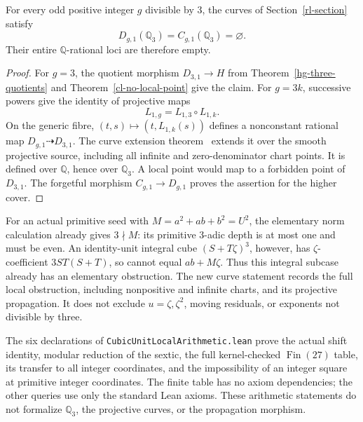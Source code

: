\begin{corollary}
\label{cl-propagation}
For every odd positive integer \(g\) divisible by \(3\), the curves
of Section~\ref{rl-section} satisfy
\[
 D_{g,1}(\mathbb Q_3)=C_{g,1}(\mathbb Q_3)=\varnothing.
\]
Their entire \(\mathbb Q\)-rational loci are therefore empty.
\end{corollary}
\begin{proof}
For \(g=3\), the quotient morphism
\(D_{3,1}\to H\) from Theorem~\ref{hg-three-quotients} and
Theorem~\ref{cl-no-local-point} give the claim.
For \(g=3k\), successive powers give the identity of projective maps
\[
 L_{1,g}=L_{1,3}\circ L_{1,k}.
\]
On the generic fibre, \((t,s)\mapsto(t,L_{1,k}(s))\) defines a
nonconstant rational map \(D_{g,1}\dashrightarrow D_{3,1}\).
The curve extension theorem~\cite{StacksCurves2026} extends it
over the smooth projective source, including all infinite and
zero-denominator chart points. It is defined over \(\mathbb Q\),
hence over \(\mathbb Q_3\). A local point would map to a forbidden
point of \(D_{3,1}\). The forgetful morphism
\(C_{g,1}\to D_{g,1}\) proves the assertion for the higher cover.
\end{proof}

For an actual primitive seed with \(M=a^2+ab+b^2=U^2\),
the elementary norm calculation already gives \(3\nmid M\):
its primitive \(3\)-adic depth is at most one and must be even.
An identity-unit integral cube \((S+T\zeta)^3\), however, has
\(\zeta\)-coefficient \(3ST(S+T)\), so cannot equal \(ab+M\zeta\).
Thus this integral subcase already has an elementary obstruction.
The new curve statement records the full local obstruction,
including nonpositive and infinite charts, and its projective
propagation. It does not exclude \(u=\zeta,\zeta^2\), moving
residuals, or exponents not divisible by three.

The six declarations of
\texttt{CubicUnitLocal\allowbreak Arithmetic.lean} prove the
actual shift identity, modular reduction of the sextic, the full
kernel-checked \(\operatorname{Fin}(27)\) table, its transfer to
all integer coordinates, and the impossibility of an integer
square at primitive integer coordinates. The finite table has
no axiom dependencies; the other queries use only the standard
Lean axioms. These arithmetic statements do not formalize
\(\mathbb Q_3\), the projective curves, or the propagation morphism.
